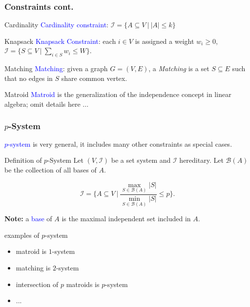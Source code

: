 \documentclass{beamer}
\newcommand{\calI}{\mathcal{I}}
\newcommand{\emRed}[1][]{\textcolor{blue} #1}
\begin{document}
\begin{frame}
  \frametitle{Constraints cont.}
  \begin{block}{Cardinality}
    \emRed{Cardinality constraint}: $\calI = \{A \subseteq V ~|~ |A| \leq k\}$
  \end{block}
  \pause
  \begin{block}{Knapsack}
   \emRed{Knapsack Constraint}: each $i \in V$ is assigned a weight $w_i \geq 0$,  $\calI = \{S \subseteq V ~|~ \sum_{i\in S} w_i \leq W \}$.
  \end{block}

  \pause

  \begin{block}{Matching}
     \emRed{Matching}: given a graph $G = (V, E)$, a \emph{Matching} is a set $S\subseteq E$ such that no edges in $S$ share common vertex.
  \end{block}
  \pause
  \begin{block}{Matroid}
    \emRed{Matroid} is the generalization of the independence concept in linear algebra;
    omit details here ...
  \end{block}


\end{frame}




\begin{frame}
  \frametitle{$p$-System}
\emRed{$p$-system} is very general, it includes many other constraints as special cases.

\begin{block}{Definition of $p$-System}
Let $(V, \calI)$ be a set system and $\calI$ hereditary.  Let $\mathcal{B}(A)$ be the collection of all bases of $A$.

$$\calI = \{ A \subseteq V ~|~ \frac{\max_{S\in\mathcal{B}(A)}|S|}{\min_{S\in\mathcal{B}(A)}|S|} \leq p \}.$$
\end{block}
\pause
\textbf{Note:} a \emRed{base} of $A$ is the maximal independent set included in $A$. 
\pause
\begin{block}{examples of $p$-system}
  \begin{itemize}
    \item matroid is $1$-system
    \item matching is $2$-system
    \item intersection of $p$ matroids is $p$-system
    \item ...
  \end{itemize}
\end{block}
\end{frame}
\end{document}
